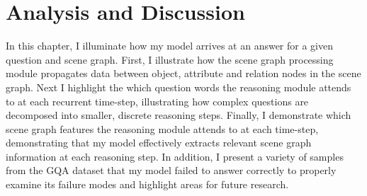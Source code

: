 \chapter{Analysis and Discussion}
\label{chapter:discussion}

In this chapter, I illuminate how my model arrives at an answer for a given question and scene graph. First, I illustrate how the scene graph processing module propagates data between object, attribute and relation nodes in the scene graph. Next I highlight the which question words the reasoning module attends to at each recurrent time-step, illustrating how complex questions are decomposed into smaller, discrete reasoning steps. Finally, I demonstrate which scene graph features the reasoning module attends to at each time-step, demonstrating that my model effectively extracts relevant scene graph information at each reasoning step. In addition, I present a variety of samples from the GQA dataset that my model failed to answer correctly to properly examine its failure modes and highlight areas for future research.

